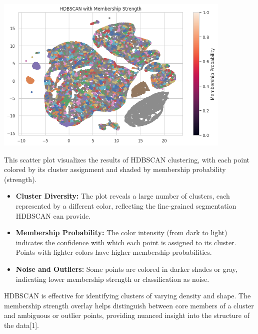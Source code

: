 \documentclass[a4paper]{article}
\begin{document}
\begin{multicols}{2}
\noindent
\begin{minipage}{\columnwidth}
\centering
\includegraphics[width=0.85\textwidth]{HDBSCAN with Membership Strength.png}
\label{fig:hdbscan_membership}
\end{minipage}

This scatter plot visualizes the results of HDBSCAN clustering, with each point colored by its cluster assignment and shaded by membership probability (strength).

\begin{itemize}
    \item \textbf{Cluster Diversity:} The plot reveals a large number of clusters, each represented by a different color, reflecting the fine-grained segmentation HDBSCAN can provide.
    \item \textbf{Membership Probability:} The color intensity (from dark to light) indicates the confidence with which each point is assigned to its cluster. Points with lighter colors have higher membership probabilities.
    \item \textbf{Noise and Outliers:} Some points are colored in darker shades or gray, indicating lower membership strength or classification as noise.
\end{itemize}

HDBSCAN is effective for identifying clusters of varying density and shape. The membership strength overlay helps distinguish between core members of a cluster and ambiguous or outlier points, providing nuanced insight into the structure of the data[1].

\vspace{1em}


\end{multicols}
\end{document}
